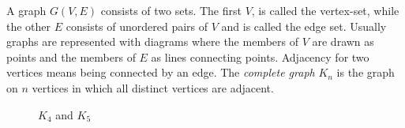 A graph $G(V,E)$ consists of two sets.
The first $V$, is called the vertex-set, while the other $E$ consists of unordered pairs of $V$ and is called the edge set.
Usually graphs are represented with diagrams where the members of $V$ are drawn as points and the members of $E$ as lines connecting points.
Adjacency for two vertices means being connected by an edge.
The \emph{complete graph} $K_n$ is the graph on $n$ vertices in which all distinct vertices are adjacent.

\begin{figure}
  \centering
  
  \caption{$K_{4}$ and $K_{5}$}
  \label{fig:complete}
\end{figure}
